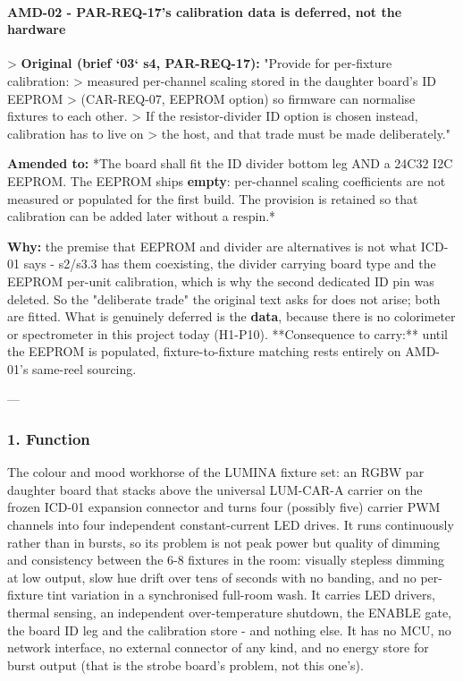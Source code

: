 \documentclass[11pt,a4paper]{article}
\begin{document}
\paragraph*{AMD-02 - PAR-REQ-17's calibration data is deferred, not the hardware}
\textgreater{} \textbf{Original (brief `03` s4, PAR-REQ-17):} "Provide for per-fixture calibration: \textgreater{} measured per-channel scaling stored in the daughter board's ID EEPROM \textgreater{} (CAR-REQ-07, EEPROM option) so firmware can normalise fixtures to each other. \textgreater{} If the resistor-divider ID option is chosen instead, calibration has to live on \textgreater{} the host, and that trade must be made deliberately."

\textbf{Amended to:} {*}The board shall fit the ID divider bottom leg AND a 24C32 I2C EEPROM. The EEPROM ships \textbf{empty}: per-channel scaling coefficients are not measured or populated for the first build. The provision is retained so that calibration can be added later without a respin.{*}

\textbf{Why:} the premise that EEPROM and divider are alternatives is not what ICD-01 says - s2/s3.3 has them coexisting, the divider carrying board type and the EEPROM per-unit calibration, which is why the second dedicated ID pin was deleted. So the "deliberate trade" the original text asks for does not arise; both are fitted. What is genuinely deferred is the \textbf{data}, because there is no colorimeter or spectrometer in this project today (H1-P10). {*}{*}Consequence to carry:{*}{*} until the EEPROM is populated, fixture-to-fixture matching rests entirely on AMD-01's same-reel sourcing.

---

\subsubsection*{1. Function}
The colour and mood workhorse of the LUMINA fixture set: an RGBW par daughter board that stacks above the universal LUM-CAR-A carrier on the frozen ICD-01 expansion connector and turns four (possibly five) carrier PWM channels into four independent constant-current LED drives. It runs continuously rather than in bursts, so its problem is not peak power but quality of dimming and consistency between the 6-8 fixtures in the room: visually stepless dimming at low output, slow hue drift over tens of seconds with no banding, and no per-fixture tint variation in a synchronised full-room wash. It carries LED drivers, thermal sensing, an independent over-temperature shutdown, the ENABLE gate, the board ID leg and the calibration store - and nothing else. It has no MCU, no network interface, no external connector of any kind, and no energy store for burst output (that is the strobe board's problem, not this one's).
\end{document}
